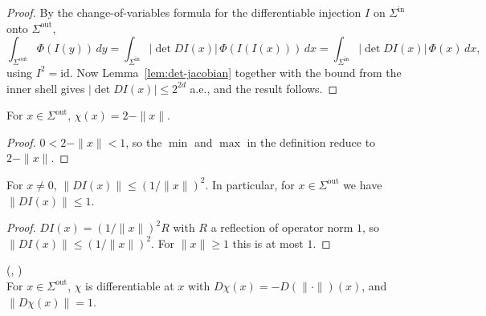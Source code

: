 \begin{proof}
\leanok
{}

By the change-of-variables formula for the differentiable injection $I$ on
$\Sigma^{\mathrm{in}}$ onto $\Sigma^{\mathrm{out}}$,
\begin{equation*}
\int_{\Sigma^{\mathrm{out}}} \Phi(I(y))\,dy
= \int_{\Sigma^{\mathrm{in}}} |\det DI(x)|\, \Phi(I(I(x)))\,dx
= \int_{\Sigma^{\mathrm{in}}} |\det DI(x)|\, \Phi(x)\,dx,
\end{equation*}
using $I^2 = \mathrm{id}$. Now Lemma~\ref{lem:det-jacobian} together with the
bound from the inner shell gives $|\det DI(x)| \le 2^{2d}$ a.e., and the
result follows.
\end{proof}

\begin{lemma}
\label{lem:unitBallCutoff_eq_two_sub_norm_of_mem_outerShell}
\leanok
{}
For $x \in \Sigma^{\mathrm{out}}$, $\chi(x) = 2 - \|x\|$.
\end{lemma}

\begin{proof}
\leanok
{}

$0 < 2 - \|x\| < 1$, so the $\min$ and $\max$ in the definition reduce to
$2 - \|x\|$.
\end{proof}

\begin{lemma}
\label{lem:norm-DI}
\leanok
{}
For $x \neq 0$, $\|DI(x)\| \le (1/\|x\|)^2$. In particular, for
$x \in \Sigma^{\mathrm{out}}$ we have $\|DI(x)\| \le 1$.
\end{lemma}

\begin{proof}
\leanok

$DI(x) = (1/\|x\|)^2 R$ with $R$ a reflection of operator norm $1$, so
$\|DI(x)\| \le (1/\|x\|)^2$. For $\|x\| \ge 1$ this is at most $1$.
\end{proof}

\begin{lemma}
\label{lem:hasFDerivAt_unitBallCutoff_of_mem_outerShell}
\leanok
{}
(,
)\\
For $x \in \Sigma^{\mathrm{out}}$, $\chi$ is differentiable at $x$ with
$D\chi(x) = -D(\|\cdot\|)(x)$, and $\|D\chi(x)\| = 1$.
\end{lemma}

